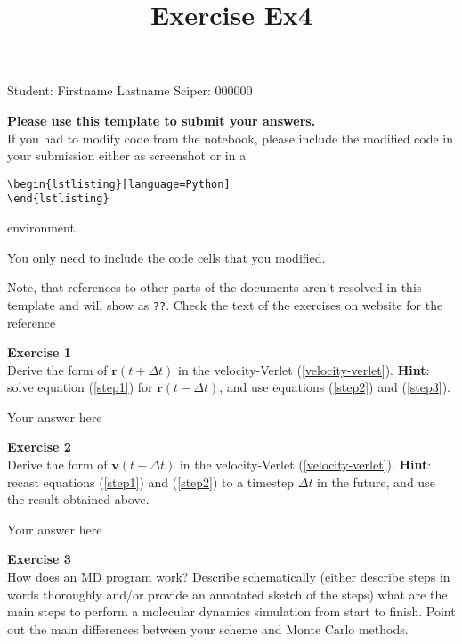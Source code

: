 \documentclass{article}
\title{Exercise Ex4}
\begin{document}
\maketitle\maketitle

Student:  Firstname Lastname    Sciper: 000000

\begin{mdframed}
\textbf{Please use this template to submit your answers.}\\
If you had to modify code from the notebook, please include the modified code in your submission either as screenshot or in a

\begin{verbatim}
\begin{lstlisting}[language=Python]
\end{lstlisting}
\end{verbatim}

environment.

You only need to include the code cells that you modified.

Note, that references to other parts of the documents aren't resolved in this template and will show as \texttt{??}. Check the text of the exercises on website for the reference
\end{mdframed}

\begin{mdframed}
\textbf{Exercise 1}\\
Derive the form of $\mathbf{r}(t + \Delta t)$ in the velocity-Verlet
(\ref{velocity-verlet}). \textbf{Hint}: solve equation  (\ref{step1}) for  $\mathbf{r}(t - \Delta t)$, and use equations (\ref{step2}) and  (\ref{step3}).
\end{mdframed}

Your answer here

\begin{mdframed}
\textbf{Exercise 2}\\
Derive the form of $\mathbf{v}(t + \Delta t)$ in the velocity-Verlet  (\ref{velocity-verlet}). \textbf{Hint}: recast equations  (\ref{step1}) and (\ref{step2}) to a  timestep $\Delta t$ in the future, and use the result obtained  above.
\end{mdframed}

Your answer here

\begin{mdframed}
\textbf{Exercise 3}\\
How does an MD program work? Describe schematically (either describe steps in words thoroughly and/or provide an annotated sketch of the steps) what are the main steps to perform a molecular dynamics simulation from start to finish. Point out the main
differences between your scheme and Monte Carlo methods.
\end{mdframed}
\end{document}
